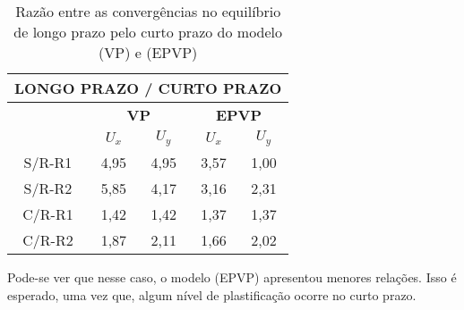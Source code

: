 \begin{table}[H]
	\caption{Razão entre as convergências no equilíbrio de longo prazo pelo curto prazo do modelo (VP) e (EPVP)}
	\label{convergencias_analise_secao_eliptica_2}
	\centering
	\small
	\renewcommand{\arraystretch}{1.25}
	\begin{tabular}{c c c c c}
		\hline
		\multicolumn{5}{c}{\textbf{LONGO PRAZO / CURTO PRAZO}}\\	
		\hline
		\multicolumn{1}{c}{} &
		\multicolumn{2}{c}{\textbf{VP}} &
		\multicolumn{2}{c}{\textbf{EPVP}}	\\
		\multicolumn{1}{c}{} &
		\multicolumn{1}{c}{\textbf{$U_x$}} &
		\multicolumn{1}{c}{\textbf{$U_y$}} &
		\multicolumn{1}{c}{\textbf{$U_x$}} &
		\multicolumn{1}{c}{\textbf{$U_y$}} \\
		\hline
		S/R-R1	 &	4,95 &	4,95 &	3,57 &	1,00 \\
		S/R-R2	 &	5,85 &	4,17 &	3,16 &	2,31 \\
		C/R-R1	 &	1,42 &	1,42 &	1,37 &	1,37 \\
		C/R-R2	 &	1,87 &	2,11 &	1,66 &	2,02 \\
		\hline
	\end{tabular}
	\normalsize
\end{table}

Pode-se ver que nesse caso, o modelo (EPVP) apresentou menores relações. Isso é esperado, uma vez que, algum nível de plastificação ocorre no curto prazo.




